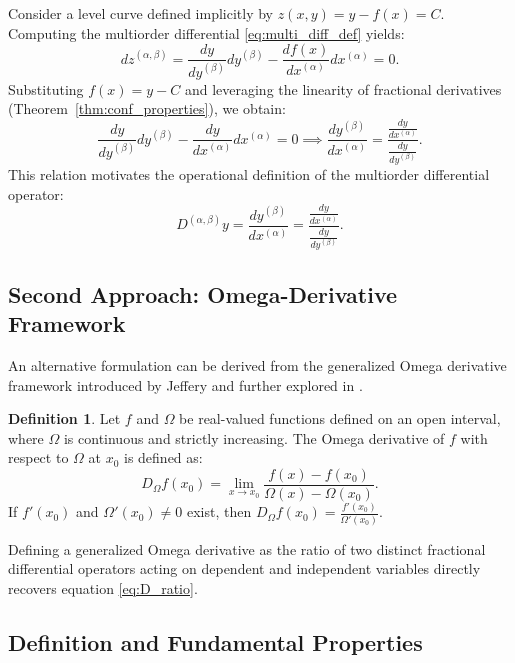 \documentclass[oneside,10pt]{article}
\theoremstyle{plain}
\theoremstyle{definition}
\newtheorem{definition}[theorem]{Definition}
\begin{document}
Consider a level curve defined implicitly by $z(x,y) = y - f(x) = C$. Computing the multiorder differential \eqref{eq:multi_diff_def} yields:
\[
dz^{(\alpha,\beta)} = \frac{dy}{dy^{(\beta)}} dy^{(\beta)} - \frac{df(x)}{dx^{(\alpha)}} dx^{(\alpha)} = 0.
\]
Substituting $f(x) = y - C$ and leveraging the linearity of fractional derivatives (Theorem~\ref{thm:conf_properties}), we obtain:
\[
\frac{dy}{dy^{(\beta)}} dy^{(\beta)} - \frac{dy}{dx^{(\alpha)}} dx^{(\alpha)} = 0 \implies \frac{dy^{(\beta)}}{dx^{(\alpha)}} = \frac{\frac{dy}{dx^{(\alpha)}}}{\frac{dy}{dy^{(\beta)}}}.
\]
This relation motivates the operational definition of the multiorder differential operator:
\begin{equation}\label{eq:D_ratio}
D^{(\alpha,\beta)} y = \frac{dy^{(\beta)}}{dx^{(\alpha)}} = \frac{\frac{dy}{dx^{(\alpha)}}}{\frac{dy}{dy^{(\beta)}}}.
\end{equation}

\subsection{Second Approach: Omega-Derivative Framework}

An alternative formulation can be derived from the generalized Omega derivative framework introduced by Jeffery \cite{Jeffery1958} and further explored in \cite{Castillo2008, Castillo2024}.

\begin{definition}\cite{Castillo2024, Jeffery1958}
Let $f$ and $\Omega$ be real-valued functions defined on an open interval, where $\Omega$ is continuous and strictly increasing. The Omega derivative of $f$ with respect to $\Omega$ at $x_0$ is defined as:
\begin{equation}
D_\Omega f(x_0) = \lim_{x \to x_0} \frac{f(x) - f(x_0)}{\Omega(x) - \Omega(x_0)}.
\end{equation}
If $f'(x_0)$ and $\Omega'(x_0) \neq 0$ exist, then $D_\Omega f(x_0) = \frac{f'(x_0)}{\Omega'(x_0)}$.
\end{definition}

Defining a generalized Omega derivative as the ratio of two distinct fractional differential operators acting on dependent and independent variables directly recovers equation \eqref{eq:D_ratio}.

\subsection{Definition and Fundamental Properties}
\end{document}
